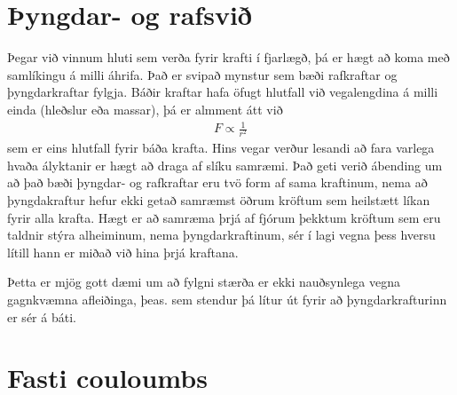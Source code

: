 \section{Þyngdar- og rafsvið}
Þegar við vinnum hluti sem verða fyrir krafti í fjarlægð, þá er hægt að koma
með samlíkingu á milli áhrifa. Það er svipað mynstur sem bæði rafkraftar
og þyngdarkraftar fylgja. Báðir kraftar hafa öfugt hlutfall við vegalengdina
á milli einda (hleðslur eða massar), þá er almment átt við
\begin{align*}
	F \propto \frac{1}{r^2}
\end{align*}
sem er eins hlutfall fyrir báða krafta. Hins vegar verður lesandi að fara
varlega hvaða ályktanir er hægt að draga af slíku samræmi. Það geti verið
ábending um að það bæði þyngdar- og rafkraftar eru tvö form af sama kraftinum,
nema að þyngdakraftur hefur ekki getað samræmst öðrum kröftum sem heilstætt
líkan fyrir alla krafta. Hægt er að samræma þrjá af fjórum þekktum kröftum
sem eru taldnir stýra alheiminum, nema þyngdarkraftinum, sér í lagi vegna
þess hversu lítill hann er miðað við hina þrjá kraftana.

Þetta er mjög gott dæmi um að fylgni stærða er ekki nauðsynlega vegna
gagnkvæmna afleiðinga, þeas. sem stendur þá lítur út fyrir að
þyngdarkrafturinn er sér á báti.

\section{Fasti couloumbs}

